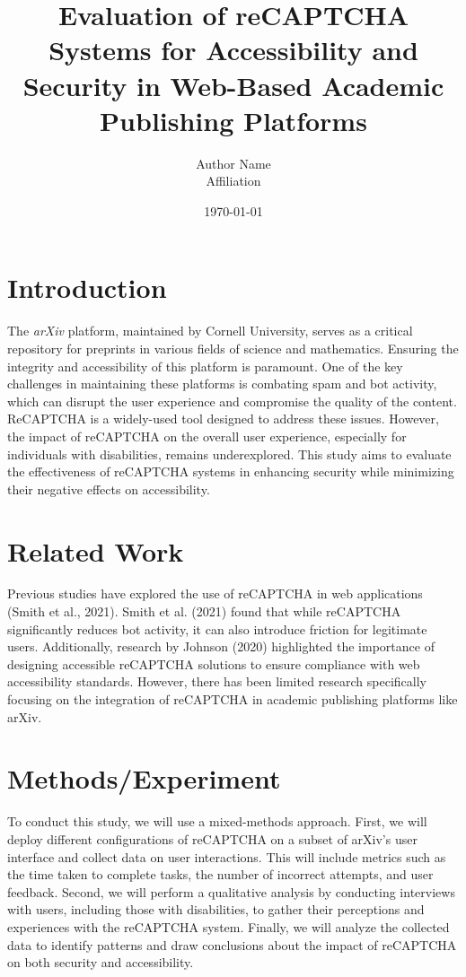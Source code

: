 \documentclass{article}
\title{Evaluation of reCAPTCHA Systems for Accessibility and Security in Web-Based Academic Publishing Platforms}
\author{Author Name\\Affiliation}
\date{\today}
\begin{document}
\maketitle

\section{Introduction}
The \textit{arXiv} platform, maintained by Cornell University, serves as a critical repository for preprints in various fields of science and mathematics. Ensuring the integrity and accessibility of this platform is paramount. One of the key challenges in maintaining these platforms is combating spam and bot activity, which can disrupt the user experience and compromise the quality of the content. ReCAPTCHA is a widely-used tool designed to address these issues. However, the impact of reCAPTCHA on the overall user experience, especially for individuals with disabilities, remains underexplored. This study aims to evaluate the effectiveness of reCAPTCHA systems in enhancing security while minimizing their negative effects on accessibility.

\section{Related Work}
Previous studies have explored the use of reCAPTCHA in web applications (Smith et al., 2021). Smith et al. (2021) found that while reCAPTCHA significantly reduces bot activity, it can also introduce friction for legitimate users. Additionally, research by Johnson (2020) highlighted the importance of designing accessible reCAPTCHA solutions to ensure compliance with web accessibility standards. However, there has been limited research specifically focusing on the integration of reCAPTCHA in academic publishing platforms like arXiv.

\section{Methods/Experiment}
To conduct this study, we will use a mixed-methods approach. First, we will deploy different configurations of reCAPTCHA on a subset of arXiv's user interface and collect data on user interactions. This will include metrics such as the time taken to complete tasks, the number of incorrect attempts, and user feedback. Second, we will perform a qualitative analysis by conducting interviews with users, including those with disabilities, to gather their perceptions and experiences with the reCAPTCHA system. Finally, we will analyze the collected data to identify patterns and draw conclusions about the impact of reCAPTCHA on both security and accessibility.
\end{document}
